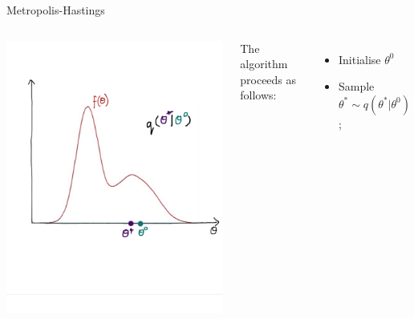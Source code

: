 \documentclass[compress]{beamer}
\begin{document}
\begin{frame}[label=sec-7-3]{Metropolis-Hastings}
\begin{columns}[c] 
\includegraphics[width=0.8\linewidth]{MH2}

The algorithm proceeds as follows:
\begin{itemize}
\item Initialise $\theta^{0}$
\item Sample $\theta^* \sim q(\theta^*|\theta^{0})$;
\end{itemize}
\end{columns}
\end{frame}
\end{document}
